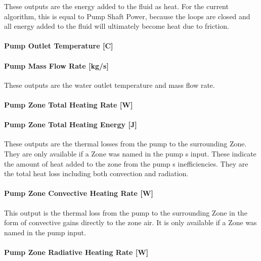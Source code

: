 These outputs are the energy added to the fluid as heat. For the current algorithm, this is equal to Pump Shaft Power, because the loops are closed and all energy added to the fluid will ultimately become heat due to friction.

\paragraph{Pump Outlet Temperature {[}C{]}}\label{pump-outlet-temperature-c-2}

\paragraph{Pump Mass Flow Rate {[}kg/s{]}}\label{pump-mass-flow-rate-kgs-2}

These outputs are the water outlet temperature and mass flow rate.

\paragraph{Pump Zone Total Heating Rate {[}W{]}}\label{pump-zone-total-heating-rate-w-2}

\paragraph{Pump Zone Total Heating Energy {[}J{]}}\label{pump-zone-total-heating-energy-j-2}

These outputs are the thermal losses from the pump to the surrounding Zone. They are only available if a Zone was named in the pump s input. These indicate the amount of heat added to the zone from the pump s inefficiencies. They are the total heat loss including both convection and radiation.

\paragraph{Pump Zone Convective Heating Rate {[}W{]}}\label{pump-zone-convective-heating-rate-w-2}

This output is the thermal loss from the pump to the surrounding Zone in the form of convective gains directly to the zone air. It is only available if a Zone was named in the pump input.

\paragraph{Pump Zone Radiative Heating Rate {[}W{]}}\label{pump-zone-radiative-heating-rate-w-2}

